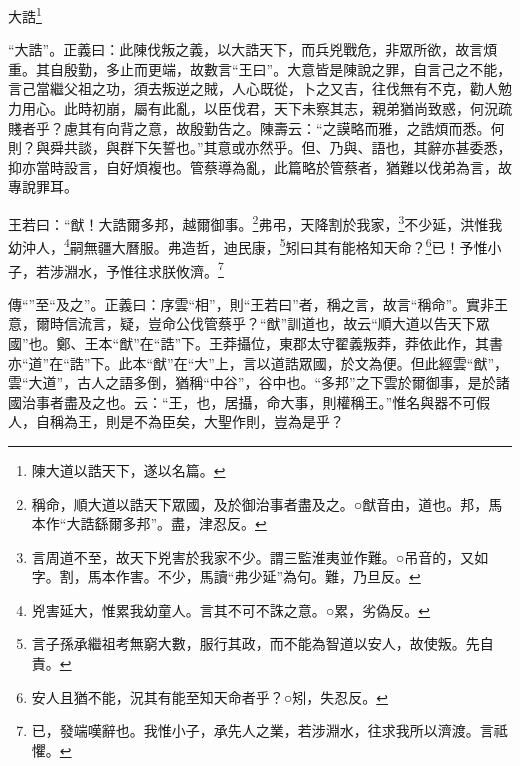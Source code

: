 大誥\footnote{陳大道以誥天下，遂以名篇。}

{\noindent\shu{}\fzkt “大誥”。正義曰：此陳伐叛之義，以大誥天下，而兵兇戰危，非眾所欲，故言煩重。其自殷勤，多止而更端，故數言“王曰”。大意皆是陳說之罪，自言己之不能，言己當繼父祖之功，須去叛逆之賊，人心既從，卜之又吉，往伐無有不克，勸人勉力用心。此時初崩，屬有此亂，以臣伐君，天下未察其志，親弟猶尚致惑，何況疏賤者乎？慮其有向背之意，故殷勤告之。陳壽云：“之謨略而雅，之誥煩而悉。何則？與舜共談，與群下矢誓也。”其意或亦然乎。但、乃與、語也，其辭亦甚委悉，抑亦當時設言，自好煩複也。管蔡導為亂，此篇略於管蔡者，猶難以伐弟為言，故專說罪耳。 \par}

王若曰：“猷！大誥爾多邦，越爾御事。\footnote{稱命，順大道以誥天下眾國，及於御治事者盡及之。○猷音由，道也。邦，馬本作“大誥繇爾多邦”。盡，津忍反。}弗弔，天降割於我家，\footnote{言周道不至，故天下兇害於我家不少。謂三監淮夷並作難。○吊音的，又如字。割，馬本作害。不少，馬讀“弗少延”為句。難，乃旦反。}不少延，洪惟我幼沖人，\footnote{兇害延大，惟累我幼童人。言其不可不誅之意。○累，劣偽反。}嗣無疆大曆服。弗造哲，迪民康，\footnote{言子孫承繼祖考無窮大數，服行其政，而不能為智道以安人，故使叛。先自責。}矧曰其有能格知天命？\footnote{安人且猶不能，況其有能至知天命者乎？○矧，失忍反。}已！予惟小子，若涉淵水，予惟往求朕攸濟。\footnote{已，發端嘆辭也。我惟小子，承先人之業，若涉淵水，往求我所以濟渡。言祗懼。}


{\noindent\zhuan{}\fzbyks 傳“”至“及之”。正義曰：序雲“相”，則“王若曰”者，稱之言，故言“稱命”。實非王意，爾時信流言，疑，豈命公伐管蔡乎？“猷”訓道也，故云“順大道以告天下眾國”也。鄭、王本“猷”在“誥”下。王莽攝位，東郡太守翟義叛莽，莽依此作，其書亦“道”在“誥”下。此本“猷”在“大”上，言以道誥眾國，於文為便。但此經雲“猷”，雲“大道”，古人之語多倒，猶稱“中谷”，谷中也。“多邦”之下雲於爾御事，是於諸國治事者盡及之也。云：“王，也，居攝，命大事，則權稱王。”惟名與器不可假人，自稱為王，則是不為臣矣，大聖作則，豈為是乎？ \par}

